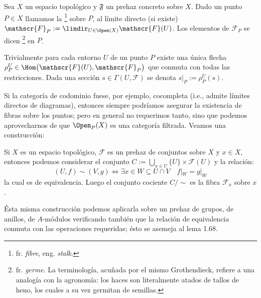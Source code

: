 \begin{mydef}
	Sea $X$ un espacio topológico y $\mathfrak{F}$ un prehaz concreto sobre $X$.
	Dado un punto $P \in X$ llamamos la %
	\footnote{fr. \textit{fibre}, eng. \textit{stalk}.}
	sobre $P$, al límite directo (si existe) $\mathscr{F}_P := \limdir_{U \in\Open(X)} \mathscr{F}(U)$.
	Los elementos de $\mathscr{F}_P$ se dicen %
	\footnote{fr. \textit{germe}.
		La terminología, acuñada por el mismo Grothendieck, refiere a una analogía con la agronomía:
		los haces son literalmente atados de tallos de heno, los cuales a su vez germitan de semillas.
	}
	 en $P$.

	Trivialmente para cada entorno $U$ de un punto $P$ existe una única flecha $\rho^U_P \in \Hom\big( \mathscr{F}(U), \mathscr{F}_P \big)$ que
	conmuta con todas las restricciones.
	Dada una sección $s \in \Gamma(U, \mathscr{F})$ se denota $s|_P := \rho^U_P(s)$.
\end{mydef}
Si la categoría de codominio fuese, por ejemplo, cocompleta (i.e., admite límites directos de diagramas),
entonces siempre podríamos asegurar la existencia de fibras sobre los puntos;
pero en general no requerimos tanto, sino que podemos aprovecharnos de que $\Open_P(X)$ es una categoría filtrada.
Veamos una construcción:

\begin{prop}
	Si $X$ es un espacio topológico, $\mathscr{F}$ es un prehaz de conjuntos sobre $X$ y $x \in X$,
	entonces podemos considerar el conjunto $C := \bigcup_{x\in U} \{ U \} \times \mathscr{F}(U)$ y la relación:
	$$ (U, f) \sim (V, g) \iff \exists x \in W \subseteq U \cap V \quad f|_W = g|_W $$
	la cual es de equivalencia. Luego el conjunto cociente $C/\sim$ es la fibra $\mathscr{F}_x$ sobre $x$.
\end{prop}
Ésta misma construcción podemos aplicarla sobre un prehaz de grupos, de anillos, de $A$-módulos verificando también que la relación de equivalencia
conmuta con las operaciones requeridas; ésto se asemeja al lema 1.68.

